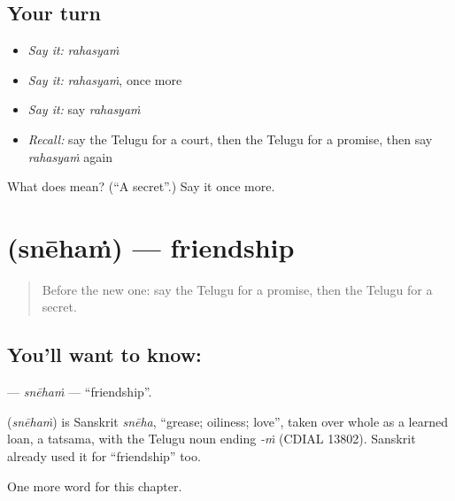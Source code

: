 \subsection*{Your turn}
\begin{itemize}
\raggedright
  \item \emph{Say it:} \emph{rahasyaṁ}
  \item \emph{Say it:} \emph{rahasyaṁ}, once more
  \item \emph{Say it:} say \emph{rahasyaṁ}
  \item \emph{Recall:} say the Telugu for a court, then the Telugu for a promise, then say \emph{rahasyaṁ} again
\end{itemize}

\begin{tcolorbox}[breakable,colback=teal!4,colframe=teal!35!black,title={Before you move on}]
What does  mean? (\textquotedblleft{}A secret\textquotedblright{}.) Say it once more.
\end{tcolorbox}
\section[\texorpdfstring{\te{స్నేహం} (snēhaṁ)}{స్నేహం (snēhaṁ)}]{ (snēhaṁ) — friendship}

\label{lesson:TE-C257-sneham}



\begin{quote}
Before the new one: say the Telugu for a promise, then the Telugu for a secret.
\end{quote}

\subsection*{You'll want to know: }
\textbf{} — \emph{snēhaṁ} — \textquotedblleft{}friendship\textquotedblright{}.

\begin{cousinweb}
\textbf{} (\emph{snēhaṁ}) is Sanskrit \emph{snēha}, \textquotedblleft{}grease; oiliness; love\textquotedblright{}, taken over whole as a learned loan, a tatsama, with the Telugu noun ending \emph{-ṁ} (CDIAL 13802). Sanskrit already used it for \textquotedblleft{}friendship\textquotedblright{} too.
\end{cousinweb}

\begin{grammarlens}[title={What you've built}]
One more word for this chapter.
\end{grammarlens}

